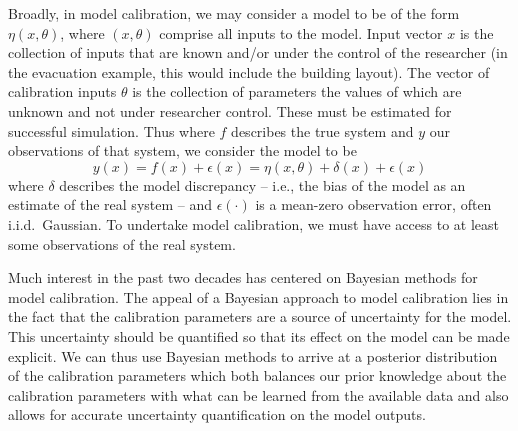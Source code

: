 \documentclass{article}
\begin{document}
Broadly, in model calibration, we may consider a model to be of the form $\eta(x,\theta)$, where $(x,\theta)$ comprise all inputs to the model. Input vector $x$ is the collection of inputs that are known and/or under the control of the researcher (in the evacuation example, this would include the building layout).  The vector of calibration inputs $\theta$ is the collection of parameters the values of which are unknown and not under researcher control. These must be estimated for successful simulation. Thus where $f$ describes the true system and $y$ our observations of that system, we consider the model to be 
\begin{equation} \label{eq:model_gen}
y(x)=f(x)+\epsilon(x)=\eta(x,\theta) + \delta(x)+\epsilon(x)
\end{equation} 
where $\delta$ describes the model discrepancy -- i.e., the bias of the model as an estimate of the real system -- and $\epsilon(\cdot)$ is a mean-zero observation error, often i.i.d.\ Gaussian. %
To undertake model calibration, we must have access to at least some observations of the real system.%

Much interest in the past two decades has centered on Bayesian methods for model calibration. The appeal of a Bayesian approach to model calibration lies in the fact that the calibration parameters are a source of uncertainty for the model. This uncertainty should be quantified so that its effect on the model can be made explicit. We can thus use Bayesian methods to arrive at a posterior distribution of the calibration parameters which both balances our prior knowledge about the calibration parameters with what can be learned from the available data and also allows for accurate uncertainty quantification on the model outputs. 
\end{document}
